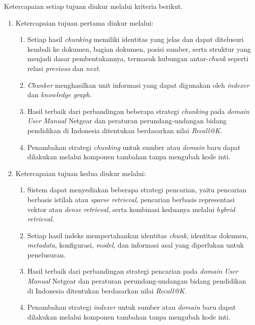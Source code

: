 \noindent Ketercapaian setiap tujuan diukur melalui kriteria berikut.

\begin{enumerate}
    \item Ketercapaian tujuan pertama diukur melalui:
    \begin{enumerate}[label=\alph*.]
        \item Setiap hasil \emph{chunking} memiliki identitas yang jelas dan dapat ditelusuri kembali ke dokumen, bagian dokumen, posisi sumber, serta struktur yang menjadi dasar pembentukannya, termasuk hubungan antar-\emph{chunk} seperti relasi \emph{previous} dan \emph{next}.
        \item \emph{Chunker} menghasilkan unit informasi yang dapat digunakan oleh \emph{indexer} dan \emph{knowledge graph}.
        \item Hasil terbaik dari perbandingan beberapa strategi \emph{chunking} pada \emph{domain} \emph{User Manual} Netgear dan peraturan perundang-undangan bidang pendidikan di Indonesia ditentukan berdasarkan nilai \emph{Recall@K}.
        \item Penambahan strategi \emph{chunking} untuk sumber atau \emph{domain} baru dapat dilakukan melalui komponen tambahan tanpa mengubah kode inti.
    \end{enumerate}

    \item Ketercapaian tujuan kedua diukur melalui:
    \begin{enumerate}[label=\alph*.]
        \item Sistem dapat menyediakan beberapa strategi pencarian, yaitu pencarian berbasis istilah atau \emph{sparse retrieval}, pencarian berbasis representasi vektor atau \emph{dense retrieval}, serta kombinasi keduanya melalui \emph{hybrid retrieval}.
        \item Setiap hasil indeks mempertahankan identitas \emph{chunk}, identitas dokumen, \emph{metadata}, konfigurasi, \emph{model}, dan informasi asal yang diperlukan untuk penelusuran.
        \item Hasil terbaik dari perbandingan strategi pencarian pada \emph{domain} \emph{User Manual} Netgear dan peraturan perundang-undangan bidang pendidikan di Indonesia ditentukan berdasarkan nilai \emph{Recall@K}.
        \item Penambahan strategi \emph{indexer} untuk sumber atau \emph{domain} baru dapat dilakukan melalui komponen tambahan tanpa mengubah kode inti.
    \end{enumerate}


\end{enumerate}
